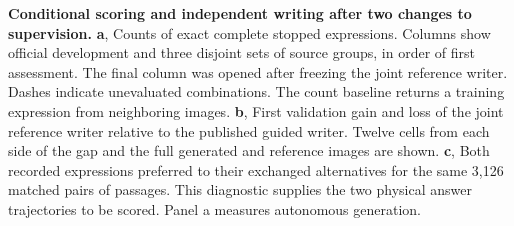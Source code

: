 \textbf{Conditional scoring and independent writing after two changes to supervision.}
\textbf{a}, Counts of exact complete stopped expressions. Columns show official development and three disjoint sets of source groups, in order of first assessment. The final column was opened after freezing the joint reference writer. Dashes indicate unevaluated combinations. The count baseline returns a training expression from neighboring images.
\textbf{b}, First validation gain and loss of the joint reference writer relative to the published guided writer. Twelve cells from each side of the gap and the full generated and reference images are shown.
\textbf{c}, Both recorded expressions preferred to their exchanged alternatives for the same 3,126 matched pairs of passages. This diagnostic supplies the two physical answer trajectories to be scored. Panel a measures autonomous generation.
